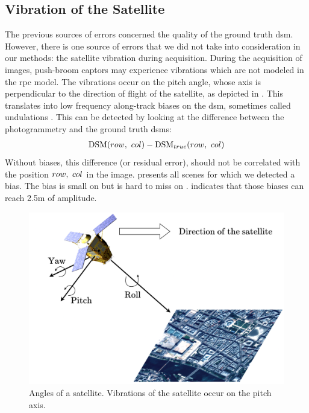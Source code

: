 \subsection{Vibration of the Satellite}\label{sec:vibrations}
The previous sources of errors concerned the quality of the ground truth \acrshort{dsm}. However, there is one source of errors that we did not take into consideration in our methods: the satellite vibration during acquisition. During the acquisition of images, push-broom captors may experience vibrations which are not modeled in the \acrshort{rpc} model. The vibrations occur on the pitch angle, whose axis is perpendicular to the direction of flight of the satellite, as depicted in . This translates into low frequency along-track biases on the \acrshort{dsm}, sometimes called undulations \cite{hugonnet_uncertainty_2022}. This can be detected by looking at the difference between the photogrammetry and the ground truth \acrshort{dsm}s:
\begin{align}
    \mathrm{DSM}(row, ~col)-\mathrm{DSM}_{true}(row, ~col)
\end{align}
Without biases, this difference (or residual error), should not be correlated with the position $row, ~col$ in the image.  presents all scenes for which we detected a bias. The bias is small on  but is hard to miss on .  indicates that those biases can reach 2.5m of amplitude.

\begin{figure}
    \centering
    \includegraphics[width=0.7\linewidth]{Images/Chap_6/Pleiade_angle_vibration.png}
    \caption{Angles of a satellite. Vibrations of the satellite occur on the pitch axis.}
    \label{fig:Pleiade_angle_vibration}
\end{figure}

